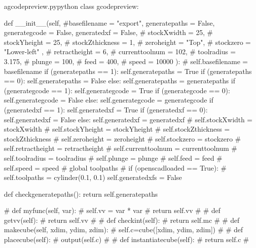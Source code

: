 \documentclass{ltxdoc}
\begin{document}
\lstset{firstnumber=\thegcpy}
\begin{writecode}{a}{gcodepreview.py}{python}
class gcodepreview:

    def __init__(self, #basefilename = "export", 
                 generatepaths = False,
                 generategcode = False,
                 generatedxf = False,
#                 stockXwidth = 25, 
#                 stockYheight = 25, 
#                 stockZthickness = 1, 
#                 zeroheight = "Top", 
#                 stockzero = "Lower-left" , 
#                 retractheight = 6, 
#                 currenttoolnum = 102,
#                 toolradius = 3.175,
#                 plunge = 100,
#                 feed = 400,
#                 speed = 10000
                  ):
#        self.basefilename = basefilename
        if (generatepaths == 1):
            self.generatepaths = True
        if (generatepaths == 0):
            self.generatepaths = False
        else:
            self.generatepaths = generatepaths
        if (generategcode == 1):
            self.generategcode = True
        if (generategcode == 0):
            self.generategcode = False
        else:
            self.generategcode = generategcode
        if (generatedxf == 1):
            self.generatedxf = True
        if (generatedxf == 0):
            self.generatedxf = False
        else:
            self.generatedxf = generatedxf
#        self.stockXwidth = stockXwidth
#        self.stockYheight = stockYheight
#        self.stockZthickness = stockZthickness
#        self.zeroheight = zeroheight
#        self.stockzero = stockzero
#        self.retractheight = retractheight
#        self.currenttoolnum = currenttoolnum
#        self.toolradius = toolradius
#        self.plunge = plunge
#        self.feed = feed
#        self.speed = speed
#        global toolpaths
#        if (openscadloaded == True):
#            self.toolpaths = cylinder(0.1, 0.1)
        self.generatedxfs = False
       
    def checkgeneratepaths():
        return self.generatepaths

#    def myfunc(self, var):
#        self.vv = var * var
#        return self.vv
#
#    def getvv(self):
#        return self.vv
#        
#    def checkint(self):
#        return self.mc
#
#    def makecube(self, xdim, ydim, zdim):
#        self.c=cube([xdim, ydim, zdim])
#        
#    def placecube(self):
#        output(self.c)
#
#    def instantiatecube(self):
#        return self.c
#
\end{writecode}
\addtocounter{gcpy}{74}
\end{document}
